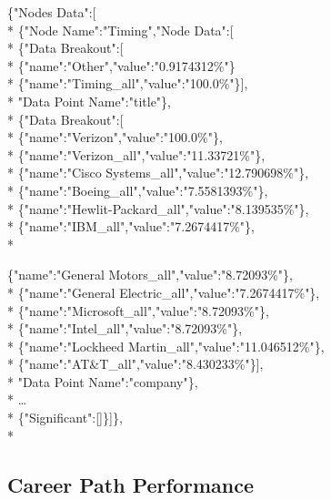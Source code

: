 \noindent \{"Nodes Data":[\\*
	\indent \{"Node Name":"Timing","Node Data":[\\*
		\indent \{"Data Breakout":[\\*
		\indent \indent	\{"name":"Other","value":"0.9174312\%"\}\\*
		\indent	\indent \{"name":"Timing_all","value":"100.0\%"\}],\\*
		\indent	"Data Point Name":"title"\},\\*
		\indent\{"Data Breakout":[\\*
		\indent	\indent	\{"name":"Verizon","value":"100.0\%"\},\\*
		\indent	\indent	\{"name":"Verizon_all","value":"11.33721\%"\},\\*
		\indent	\indent	\{"name":"Cisco Systems_all","value":"12.790698\%"\},\\*
		\indent	\indent	\{"name":"Boeing_all","value":"7.5581393\%"\},\\*
		\indent	\indent	\{"name":"Hewlit-Packard_all","value":"8.139535\%"\},\\*
		\indent	\indent	\{"name":"IBM_all","value":"7.2674417\%"\},\\*
		
		\indent	\indent	\{"name":"General Motors_all","value":"8.72093\%"\},\\*
		\indent	\indent	\{"name":"General Electric_all","value":"7.2674417\%"\},\\*
		\indent	\indent	\{"name":"Microsoft_all","value":"8.72093\%"\},\\*
		\indent	\indent	\{"name":"Intel_all","value":"8.72093\%"\},\\*
		\indent	\indent	\{"name":"Lockheed Martin_all","value":"11.046512\%"\},\\*
		\indent	\indent	\{"name":"AT&T_all","value":"8.430233\%"\}],\\*
		\indent"Data Point Name":"company"\},\\*
		\indent\ldots\\*
		\indent \{"Significant":[]\}]\},\\*

\subsection{Career Path Performance}